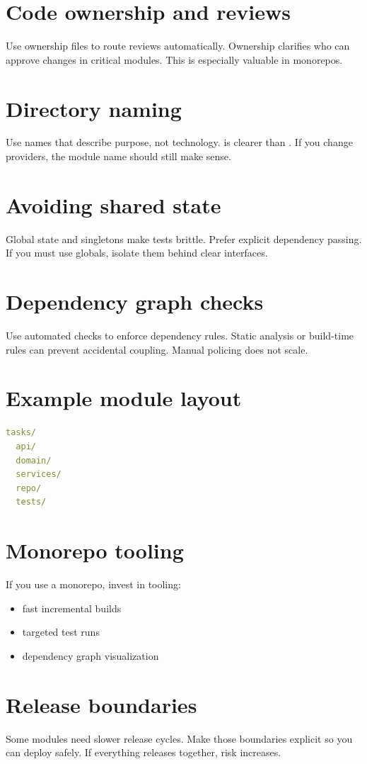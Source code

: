 \section{Code ownership and reviews}
Use ownership files to route reviews automatically.
Ownership clarifies who can approve changes in critical modules.
This is especially valuable in monorepos.

\section{Directory naming}
Use names that describe purpose, not technology.
 is clearer than .
If you change providers, the module name should still make sense.

\section{Avoiding shared state}
Global state and singletons make tests brittle.
Prefer explicit dependency passing.
If you must use globals, isolate them behind clear interfaces.

\section{Dependency graph checks}
Use automated checks to enforce dependency rules.
Static analysis or build-time rules can prevent accidental coupling.
Manual policing does not scale.

\section{Example module layout}
\begin{lstlisting}[language=YAML]
tasks/
  api/
  domain/
  services/
  repo/
  tests/
\end{lstlisting}

\section{Monorepo tooling}
If you use a monorepo, invest in tooling:
\begin{itemize}[nosep]
  \item fast incremental builds
  \item targeted test runs
  \item dependency graph visualization
\end{itemize}

\section{Release boundaries}
Some modules need slower release cycles.
Make those boundaries explicit so you can deploy safely.
If everything releases together, risk increases.

